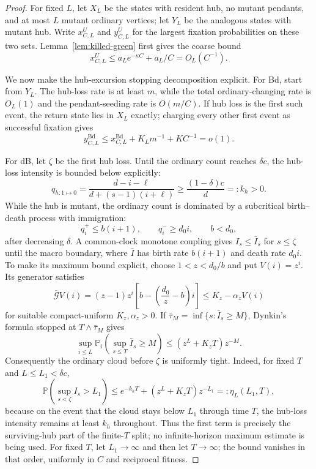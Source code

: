 \documentclass[11pt]{article}
\theoremstyle{definition}
\theoremstyle{remark}
\newcommand{\Bd}{\mathrm{Bd}}
\newcommand{\Prob}{\mathbb P}
\begin{document}
\begin{proof}
For fixed $L$, let $X_L$ be the states with resident hub, no mutant pendants,
and at most $L$ mutant ordinary vertices; let $Y_L$ be the analogous states
with mutant hub.  Write $x^U_{C,L}$ and $y^U_{C,L}$ for the largest fixation
probabilities on these two sets.  Lemma~\ref{lem:killed-green} first gives
the coarse bound
\begin{equation}
 x^U_{C,L}\leq a_Le^{-\kappa C}+a_L/C=O_L(C^{-1}).
\label{eq:renewal-coarse}
\end{equation}

We now make the hub-excursion stopping decomposition explicit.  For Bd,
start from $Y_L$.  The hub-loss rate is at least $m$, while the total
ordinary-changing rate is $O_L(1)$ and the pendant-seeding rate is $O(m/C)$.
If hub loss is the first such event, the return state lies in $X_L$ exactly;
charging every other first event as successful fixation gives
\begin{equation}
 y^{\Bd}_{C,L}\leq x^{\Bd}_{C,L}+K_Lm^{-1}+K C^{-1}=o(1).
\label{eq:renewal-y-Bd}
\end{equation}

For dB, let $\zeta$ be the first hub loss.  Until the ordinary count reaches
$\delta c$, the hub-loss intensity is bounded below explicitly:
\[
 q_{h:1\mapsto0}
 =\frac{d-i-\ell}{d+(s-1)(i+\ell)}
 \geq\frac{(1-\delta)c}{d}=:k_h>0.
\]
While the hub is mutant, the ordinary count is dominated by a
subcritical birth--death process with immigration:
\[
 q_i^+\leq b(i+1),\qquad q_i^-\geq d_0i,\qquad b<d_0,
\]
after decreasing $\delta$.  A common-clock monotone coupling gives
$I_s\leq\bar I_s$ for $s\leq\zeta$ until the macro boundary, where $\bar I$ has
birth rate $b(i+1)$ and death rate $d_0i$.  To make its maximum bound
explicit, choose $1<z<d_0/b$ and put $V(i)=z^i$.  Its generator satisfies
\[
 \overline{\mathcal G}V(i)
 =(z-1)z^i\left[b-\left(\frac{d_0}{z}-b\right)i\right]
 \leq K_z-\alpha_zV(i)
\]
for suitable compact-uniform $K_z,\alpha_z>0$.  If
$\bar\tau_M=\inf\{s:\bar I_s\geq M\}$, Dynkin's formula stopped at
$T\wedge\bar\tau_M$ gives
\begin{equation}
 \sup_{i\leq L}\Prob_i\!\left(\sup_{s\leq T}\bar I_s\geq M\right)
 \leq (z^L+K_zT)z^{-M}.
\label{eq:immigration-maximum}
\end{equation}
Consequently the ordinary cloud before $\zeta$ is uniformly tight.
Indeed, for fixed $T$ and $L\leq L_1<\delta c$,
\[
 \Prob\!\left(\sup_{s<\zeta}I_s>L_1\right)
 \leq e^{-k_hT}+(z^L+K_zT)z^{-L_1}
 =:\eta_L(L_1,T),
\]
because on the event that the cloud stays below $L_1$ through time $T$, the
hub-loss intensity remains at least $k_h$ throughout.  Thus the first term
is precisely the surviving-hub part of the finite-$T$ split; no
infinite-horizon maximum estimate is being used.
For fixed $T$, let $L_1\to\infty$ and then let $T\to\infty$; the bound
vanishes in that order,
uniformly in $C$ and reciprocal fitness.


\end{proof}
\end{document}
